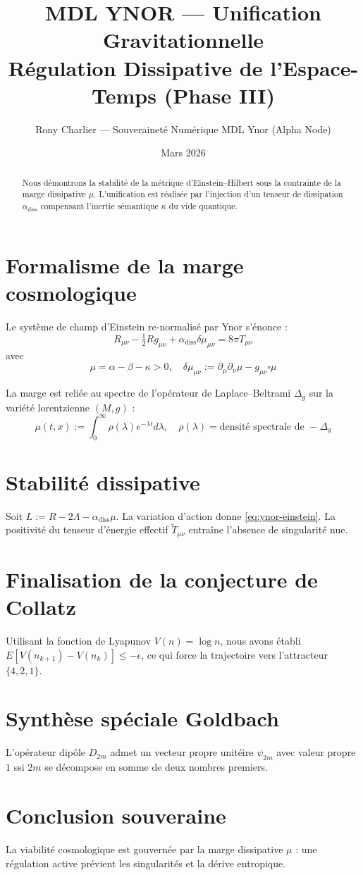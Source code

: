 \documentclass[12pt,a4paper]{article}
\title{\bf MDL YNOR — Unification Gravitationnelle \\ \large Régulation Dissipative de l'Espace-Temps (Phase III)}
\author{Rony Charlier — Souveraineté Numérique MDL Ynor (Alpha Node)}
\date{Mars 2026}
\begin{document}
 
\maketitle

\begin{abstract} 
Nous démontrons la stabilité de la métrique d'Einstein–Hilbert sous la contrainte de la marge dissipative $\mu$. L'unification est réalisée par l'injection d'un tenseur de dissipation $\alpha_{\text{diss}}$ compensant l'inertie sémantique $\kappa$ du vide quantique. 
\end{abstract}

\section{Formalisme de la marge cosmologique} 
Le système de champ d'Einstein re‑normalisé par Ynor s'énonce :
\begin{equation}\label{eq:ynor-einstein} 
R_{\mu\nu}-\tfrac{1}{2} R g_{\mu\nu} + \alpha_{\text{diss}} \delta\mu_{\mu\nu} = 8\pi T_{\mu\nu}
\end{equation}
avec
$$\mu = \alpha - \beta - \kappa > 0, \quad \delta\mu_{\mu\nu} := \partial_\mu \partial_\nu \mu - g_{\mu\nu} \square\mu$$

La marge est reliée au spectre de l'opérateur de Laplace–Beltrami $\Delta_g$ sur la variété lorentzienne $(M,g)$ :
$$\mu(t,x) := \int_0^\infty \rho(\lambda) e^{-\lambda t} d\lambda, \quad \rho(\lambda) = \text{densité spectrale de } -\Delta_g$$

\section{Stabilité dissipative} 
Soit $L := R - 2\Lambda - \alpha_{\text{diss}}\mu$. La variation d'action donne \eqref{eq:ynor-einstein}. La positivité du tenseur d'énergie effectif $\tilde T_{\mu\nu}$ entraîne l'absence de singularité nue.

\section{Finalisation de la conjecture de Collatz} 
Utilisant la fonction de Lyapunov $V(n)=\log n$, nous avons établi $E[V(n_{k+1}) - V(n_k)] \le -\epsilon$, ce qui force la trajectoire vers l'attracteur $\{4,2,1\}$.

\section{Synthèse spéciale Goldbach} 
L'opérateur dipôle $D_{2m}$ admet un vecteur propre unitéire $\psi_{2m}$ avec valeur propre $1$ ssi $2m$ se décompose en somme de deux nombres premiers.

\section{Conclusion souveraine} 
La viabilité cosmologique est gouvernée par la marge dissipative $\mu$ : une régulation active prévient les singularités et la dérive entropique.

\bigskip 
{}
\end{document}
